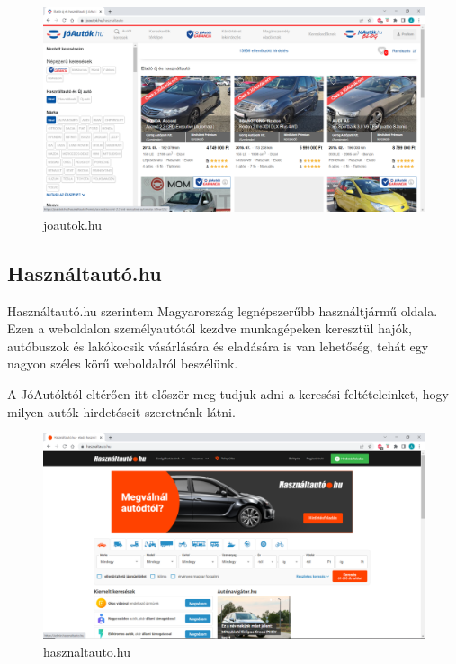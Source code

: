 \begin{figure}[h]
\centering
\includegraphics[scale=1]{images/joautok.png}
\caption{joautok.hu}
\label{fig:joautok}
\end{figure}

\subsection{Használtautó.hu}

Használtautó.hu szerintem Magyarország legnépszerűbb használtjármű oldala. Ezen a weboldalon személyautótól kezdve munkagépeken keresztül hajók, autóbuszok és lakókocsik vásárlására és eladására is van lehetőség, tehát egy nagyon széles körű weboldalról beszélünk.

A JóAutóktól eltérően itt először meg tudjuk adni a keresési feltételeinket, hogy milyen autók hirdetéseit szeretnénk látni.

\begin{figure}[h]
\centering
\includegraphics[scale=0.8]{images/hasznaltauto.png}
\caption{hasznaltauto.hu}
\label{fig:hasznaltauto}
\end{figure}
\newpage

